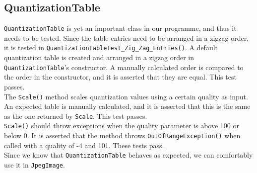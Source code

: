 \subsection{QuantizationTable}
\lstinline|QuantizationTable| is yet an important class in our programme, and thus it needs to be tested.
Since the table entries need to be arranged in a zigzag order, it is tested in \lstinline|QuantizationTableTest_Zig_Zag_Entries()|.
A default quantization table is created and arranged in a zigzag order in \lstinline|QuantizationTable|'s constructor.
A manually calculated order is compared to the order in the constructor, and it is asserted that they are equal.
This test passes.\\
The \lstinline|Scale()| method scales quantization values using a certain quality as input.
An expected table is manually calculated, and it is asserted that this is the same as the one returned by \lstinline|Scale|.
This test passes.\\
\lstinline|Scale()| should throw exceptions when the quality parameter is above 100 or below 0.
It is asserted that the method throws \lstinline|OutOfRangeException()| when called with a quality of -4 and 101.
These tests pass.\\
Since we know that \lstinline|QuantizationTable| behaves as expected, we can comfortably use it in \lstinline|JpegImage|.


